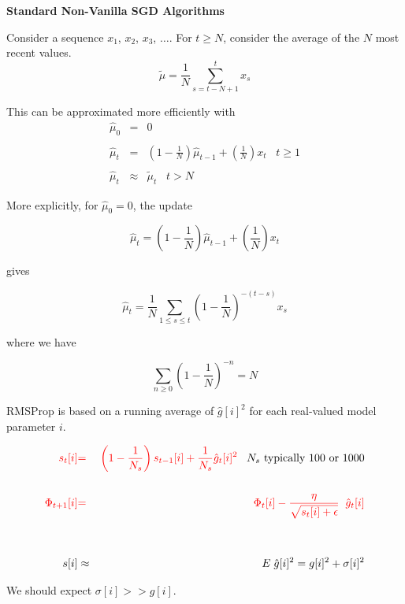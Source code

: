 {\slide{}
\centerline{\bf Standard Non-Vanilla SGD Algorithms}
\vfill
\vfill

Consider a sequence $x_1$, $x_2$, $x_3$, $\ldots$.
\vfill
For $t \geq N$, consider the average of the $N$ most recent values.
$$\tilde{\mu} = \frac{1}{N} \sum_{s=t-N+1}^t x_s$$

\vfill
This can be approximated more efficiently with
\begin{eqnarray*}
\hat{\mu}_0 & = & 0 \\
\\
\hat{\mu}_t & = & \left(1-\frac{1}{N}\right)\hat{\mu}_{t-1} + \left(\frac{1}{N}\right)x_t\;\;\;t \geq 1 \\
\\
\hat{\mu}_t & \approx & \tilde{\mu}_t \;\;\; t >N
\end{eqnarray*}


More explicitly, for $\hat{\mu}_0 = 0$, the update

$$\hat{\mu}_t = \left(1-\frac{1}{N}\right)\hat{\mu}_{t-1} + \left(\frac{1}{N}\right)x_t$$

\vfill
gives

$$\hat{\mu}_t = \frac{1}{N} \sum_{1 \leq s \leq t} \left(1-\frac{1}{N}\right)^{-(t-s)} x_s$$

\vfill
where we have

$$\sum_{n\geq 0} \left(1-\frac{1}{N}\right)^{-n} = N$$


RMSProp is based on a running average of $\hat{g}[i]^2$ for each real-valued model parameter $i$.

\begin{eqnarray*}
{\color{red} s_t[i]} & {\color{red} =} & {\color{red} \left(1-\frac{1}{N_s}\right) s_{t-1}[i] + \frac{1}{N_s} \hat{g}_t[i]^2}\;\;\;\mbox{$N_s$ typically 100 or 1000} \\
\\
{\color{red} \Phi_{t+1}[i]} & {\color{red} =} & {\color{red} \Phi_t[i] - \frac{\eta}{\sqrt{s_t[i] + \epsilon}}\;\; \hat{g}_t[i]} \\
\\
\\
s[i] & \approx & E\;\hat{g}[i]^2  =  g[i]^2 + \sigma[i]^2
\end{eqnarray*}

\vfill
We should expect $\sigma[i] >> g[i]$.


}
